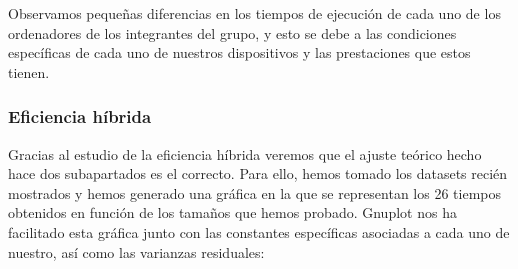 \documentclass[10pt,a4paper]{article}
\begin{document}
\begin{table}[h!]
	\centering
	\footnotesize
	\hspace{2cm}
	\hspace{2cm}
	\caption{Experiencia empírica de algoritmo de Selección sin optimizar}
\end{table}

\newpage

Observamos pequeñas diferencias en los tiempos de ejecución de cada uno de los ordenadores de los integrantes del grupo, y esto se debe a las condiciones específicas de cada uno de nuestros dispositivos y las prestaciones que estos tienen.

\subsubsection{Eficiencia híbrida}

Gracias al estudio de la eficiencia híbrida veremos que el ajuste teórico hecho hace dos subapartados es el correcto. Para ello, hemos tomado los datasets recién mostrados y hemos generado una gráfica en la que se representan los 26 tiempos obtenidos en función de los tamaños que hemos probado. Gnuplot nos ha facilitado esta gráfica junto con las constantes específicas asociadas a cada uno de nuestro, así como las varianzas residuales:
\end{document}
